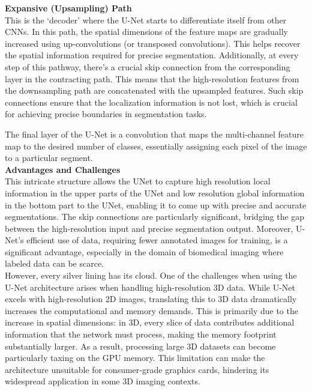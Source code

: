 \noindent\textbf{Expansive (Upsampling) Path}\\
This is the `decoder' where the U-Net starts to differentiate itself from other CNNs.
In this path, the spatial dimensions of the feature maps are gradually increased using up-convolutions
(or transposed convolutions). This helps recover the spatial information required for precise segmentation.
Additionally, at every step of this pathway, there's a crucial skip connection from the corresponding layer in the contracting path.
This means that the high-resolution features from the downsampling path are concatenated with the upsampled features.
Such skip connections ensure that the localization information is not lost,
which is crucial for achieving precise boundaries in segmentation tasks.

\noindent The final layer of the U-Net is a convolution that maps the multi-channel feature map to the desired number of classes, essentially assigning each pixel of the image to a particular segment.\\

\noindent\textbf{Advantages and Challenges}\\
This intricate structure allows the UNet to capture high resolution local information in the upper parts of the UNet and low resolution global information in the bottom part to the UNet,
enabling it to come up with precise and accurate segmentations. The skip connections are particularly significant, bridging the gap between the high-resolution input and precise segmentation output.
Moreover, U-Net's efficient use of data, requiring fewer annotated images for training, is a significant advantage, especially in the domain of biomedical imaging where labeled data can be scarce.\\
However, every silver lining has its cloud. One of the challenges when using the U-Net architecture arises when handling high-resolution 3D data. While U-Net excels with high-resolution 2D images,
translating this to 3D data dramatically increases the computational and memory demands. This is primarily due to the increase in spatial dimensions: in 3D,
every slice of data contributes additional information that the network must process, making the memory footprint substantially larger. As a result,
processing large 3D datasets can become particularly taxing on the GPU memory. This limitation can make the architecture unsuitable for consumer-grade graphics cards,
hindering its widespread application in some 3D imaging contexts.
\newpage
